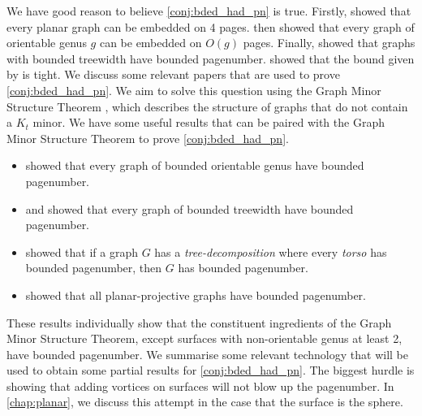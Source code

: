 We have good reason to believe \cref{conj:bded_had_pn} is true. Firstly, \textcite{yannakakisEmbeddingPlanarGraphs1989} showed that every planar graph can be embedded on 4 pages. \textcite{heathPagenumberGenusGraphs1992} then showed that every graph of orientable genus $g$ can be embedded on $O(g)$ pages. Finally, \textcite{ganleyPagenumberTrees2001} showed that graphs with bounded treewidth have bounded pagenumber. \textcite{dujmovicGraphTreewidthGeometric2007} showed that the bound given by \citeauthor{ganleyPagenumberTrees2001} is tight.
We discuss some relevant papers that are used to prove \cref{conj:bded_had_pn}.
We aim to solve this question using the Graph Minor Structure Theorem \cite{robertsonGraphMinorsXVI2003}, which describes the structure of graphs that do not contain a \(K_t\) minor. 
We have some useful results that can be paired with the Graph Minor Structure Theorem to prove \cref{conj:bded_had_pn}.
\begin{itemize}
	\item \textcite{heathPagenumberGenusGraphs1992} showed that every graph of bounded orientable genus have bounded pagenumber.
	\item \textcite{ganleyPagenumberTrees2001} and \textcite{dujmovicGraphTreewidthGeometric2007} showed that every graph of bounded treewidth have bounded pagenumber.
	\item \textcite{hickingbothamStackNumberCliqueSum2023} showed that if a graph \(G\) has a \textit{tree-decomposition} where every \textit{torso} has bounded pagenumber, then \(G\) has bounded pagenumber.
	\item \textcite{nakamotoBookEmbeddingProjectiveplanar2015} showed that all planar-projective graphs have bounded pagenumber.
\end{itemize}
These results individually show that the constituent ingredients of the Graph Minor Structure Theorem, except surfaces with non-orientable genus at least 2, have bounded pagenumber. We summarise some relevant technology that will be used to obtain some partial results for \cref{conj:bded_had_pn}. 
The biggest hurdle is showing that adding vortices on surfaces will not blow up the pagenumber. In \cref{chap:planar}, we discuss this attempt in the case that the surface is the sphere. 